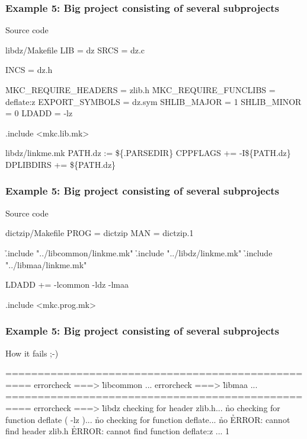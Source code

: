 \documentclass[hyperref={colorlinks=true}]{beamer}
\begin{document}
\begin{frame}[fragile]
  \frametitle{Example 5: Big project consisting of several subprojects}

  \begin{block}{Source code}
  \begin{Code}{libdz/Makefile}
LIB =            dz
SRCS =           dz.c

INCS =           dz.h

\h{MKC\_REQUIRE\_HEADERS} =    zlib.h
\h{MKC\_REQUIRE\_FUNCLIBS} =   deflate:z
EXPORT_SYMBOLS =         dz.sym
SHLIB_MAJOR =            1
SHLIB_MINOR =            0
LDADD =                  -lz

.include <mkc.lib.mk>
  \end{Code}
  \begin{Code}{libdz/linkme.mk}
PATH.dz :=       \$\{.PARSEDIR\}
CPPFLAGS +=      -I\$\{PATH.dz\}
DPLIBDIRS +=     \$\{PATH.dz\}
  \end{Code}
  \end{block}
\end{frame}

\begin{frame}[fragile]
  \frametitle{Example 5: Big project consisting of several subprojects}

  \begin{block}{Source code}
  \begin{Code}{dictzip/Makefile}
PROG =   dictzip
MAN =    dictzip.1

\h{.include} "../libcommon/linkme.mk"
\h{.include} "../libdz/linkme.mk"
\h{.include} "../libmaa/linkme.mk"

LDADD +=        -lcommon -ldz -lmaa

.include <mkc.prog.mk>
  \end{Code}
  \end{block}
\end{frame}

\begin{frame}[fragile]
  \frametitle{Example 5: Big project consisting of several subprojects}

  \begin{block}{How it fails ;-)}
  \begin{CodeNoLabel}
==================================================
errorcheck ===> \h{libcommon}
...
errorcheck ===> \h{libmaa}
...
==================================================
errorcheck ===> \h{libdz}
checking for header zlib.h... \h{no}
checking for function deflate ( -lz )... \h{no}
checking for function deflate... \h{no}
\h{ERROR: cannot find header zlib.h}
\h{ERROR: cannot find function deflate:z}
...
1
\prompt{\$}
  \end{CodeNoLabel}
  \end{block}
\end{frame}
\end{document}
